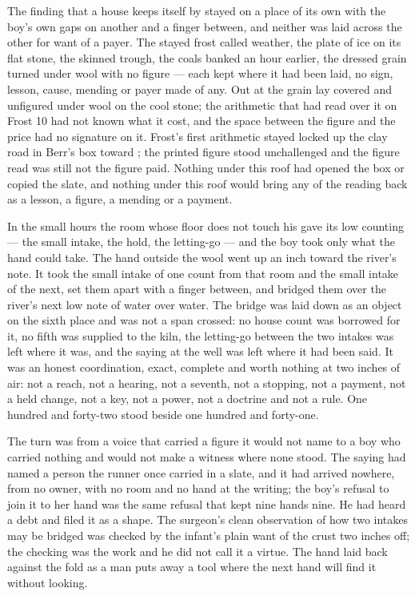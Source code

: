 The finding that a house keeps itself by  stayed on a place of its own with the boy's own gaps on another and a finger between, and neither was laid across the other for want of a payer. The stayed frost called weather, the plate of ice on its flat stone, the skinned trough, the coals banked an hour earlier, the dressed grain turned under wool with no figure --- each kept where it had been laid, no sign, lesson, cause, mending or payer made of any. Out at  the grain lay covered and unfigured under wool on the cool stone; the arithmetic that had read over it on Frost 10 had not known what it cost, and the space between the figure and the price had no signature on it. Frost's first arithmetic stayed locked up the clay road in Berr's box toward ; the printed figure stood unchallenged and the figure read was still not the figure paid. Nothing under this roof had opened the box or copied the slate, and nothing under this roof would bring any of the reading back as a lesson, a figure, a mending or a payment.

In the small hours the room whose floor does not touch his gave its low counting --- the small intake, the hold, the letting-go --- and the boy took only what the hand could take. The hand outside the wool went up an inch toward the river's note. It took the small intake of one count from that room and the small intake of the next, set them apart with a finger between, and bridged them over the river's next low note of water over water. The bridge was laid down as an object on the sixth place and was not a span crossed: no house count was borrowed for it, no fifth was supplied to the kiln, the letting-go between the two intakes was left where it was, and the saying at the well was left where it had been said. It was an honest coordination, exact, complete and worth nothing at two inches of air: not a reach, not a hearing, not a seventh, not a stopping, not a payment, not a held change, not a key, not a power, not a doctrine and not a rule. One hundred and forty-two stood beside one hundred and forty-one.

The turn was from a voice that carried a figure it would not name to a boy who carried nothing and would not make a witness where none stood. The saying had named a person the runner once carried in a slate, and it had arrived nowhere, from no owner, with no room and no hand at the writing; the boy's refusal to join it to her hand was the same refusal that kept nine hands nine. He had heard a debt and filed it as a shape. The surgeon's clean observation of how two intakes may be bridged was checked by the infant's plain want of the crust two inches off; the checking was the work and he did not call it a virtue. The hand laid back against the fold as a man puts away a tool where the next hand will find it without looking.

